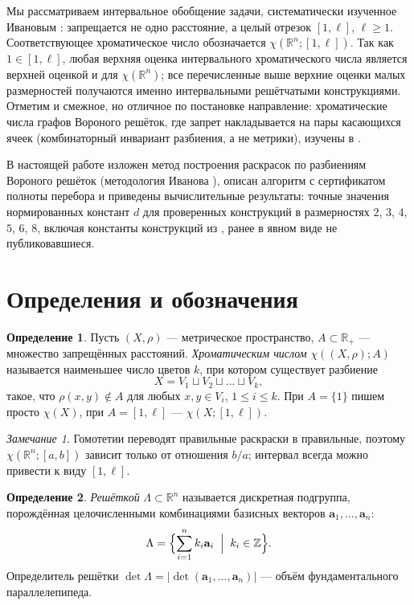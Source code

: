 \documentclass[12pt]{article}
\theoremstyle{plain}
\theoremstyle{definition}
\newtheorem{definition}{Определение}
\theoremstyle{remark}
\newtheorem{remark}{Замечание}
\newcommand{\RR}{\mathbb{R}}
\newcommand{\ZZ}{\mathbb{Z}}
\begin{document}
Мы рассматриваем интервальное обобщение задачи, систематически изученное
Ивановым \cite{Ivanov2011}: запрещается не одно расстояние, а целый отрезок
$[1,\ell]$, $\ell\ge 1$. Соответствующее хроматическое число обозначается
$\chi(\RR^n;[1,\ell])$. Так как $1\in[1,\ell]$, любая верхняя оценка
интервального хроматического числа является верхней оценкой и для
$\chi(\RR^n)$; все перечисленные выше верхние оценки малых размерностей
получаются именно интервальными решётчатыми конструкциями. Отметим и смежное,
но отличное по постановке направление: хроматические числа графов Вороного
решёток, где запрет накладывается на пары касающихся ячеек (комбинаторный
инвариант разбиения, а не метрики), изучены в \cite{DutourSikiric2021}.

В настоящей работе изложен метод построения раскрасок по разбиениям
Вороного решёток (методология Иванова \cite{Ivanov2011}), описан алгоритм с
сертификатом полноты перебора и приведены вычислительные результаты: точные
значения нормированных констант $d$ для проверенных конструкций в размерностях
$2$, $3$, $4$, $5$, $6$, $8$, включая константы конструкций из
\cite{Arman2021}, ранее в явном виде не публиковавшиеся.

\section{Определения и обозначения}

\begin{definition}
Пусть $(X,\rho)$ --- метрическое пространство, $A\subset\RR_{+}$ --- множество
запрещённых расстояний. \emph{Хроматическим числом} $\chi((X,\rho);A)$
называется наименьшее число цветов $k$, при котором существует разбиение
\[
X = V_1 \sqcup V_2 \sqcup \dots \sqcup V_k,
\]
такое, что $\rho(x,y)\notin A$ для любых $x,y\in V_i$, $1\le i\le k$. При
$A=\{1\}$ пишем просто $\chi(X)$, при $A=[1,\ell]$ --- $\chi(X;[1,\ell])$.
\end{definition}

\begin{remark}
Гомотетии переводят правильные раскраски в правильные, поэтому
$\chi(\RR^n;[a,b])$ зависит только от отношения $b/a$; интервал всегда можно
привести к виду $[1,\ell]$.
\end{remark}

\begin{definition}
\emph{Решёткой} $\Lambda\subset\RR^n$ называется дискретная подгруппа,
порождённая целочисленными комбинациями базисных векторов
$\mathbf{a}_1,\dots,\mathbf{a}_n$:
\[
\Lambda=\Bigl\{\sum_{i=1}^{n}k_i\mathbf{a}_i \;\Bigm|\; k_i\in\ZZ\Bigr\}.
\]
Определитель решётки $\det\Lambda=|\det(\mathbf{a}_1,\dots,\mathbf{a}_n)|$ ---
объём фундаментального параллелепипеда.
\end{definition}
\end{document}
